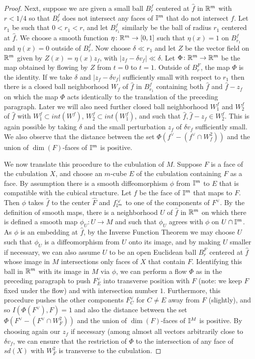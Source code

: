 \begin{proof}
	Next, suppose we are given a small ball $B^f_r$ centered at $\hat f$ in $\mathbb{R}^m$ with $r<1/4$ so that $B^f_r$ does not intersect any faces of $\mathbb{I}^m$ that do not intersect $f$.
	Let $r_1$ be such that $0<r_1<r$, and let $B^f_{r_1}$ similarly be the ball of radius $r_1$ centered at $\hat f$.
	We choose a smooth function $\eta \colon \mathbb{R}^m \to [0,1]$ such that $\eta(x) = 1$ on $B^f_{r_1}$ and $\eta(x) = 0$ outside of $B^f_r$.
	Now choose $\delta\ll r_1$ and let $Z$ be the vector field on $\mathbb{R}^m$ given by $Z(x) = \eta(x)z_f$, with $|z_f-\delta v_f|\ll \delta$.
	Let $\Phi \colon \mathbb{R}^m \to \mathbb{R}^m$ be the map obtained by flowing by $Z$ from $t = 0$ to $t = 1$.
	Outside of $B^F_{r}$, the map $\Phi$ is the identity.
	If we take $\delta$ and $|z_f-\delta v_f|$ sufficiently small with respect to $r_1$ then there is a closed ball neighborhood $W_f$ of $\hat f$ in $B^f_{r_1}$ containing both $\hat f$ and $\hat f-z_f$
	on which the map $\Phi$ acts identically to the translation of the preceding paragraph.
	Later we will also need further closed ball neighborhood $W^f_1$ and $W^f_2$ of $\hat f$ with $W^f_1 \subset int(W^f)$, $W^f_2 \subset int(W^f_1)$, and such that $\hat f, \hat f-z_f \in W^f_2$.
	This is again possible by taking $\delta$ and the small perturbation $z_f$ of $\delta v_f$ sufficiently small.
	We also observe that the distance between the set $\Phi(f^\vee-(f^\vee \cap W^2_f))$ and the union of $\dim(F)$-faces of $\mathbb{I}^m$ is positive.

	We now translate this procedure to the cubulation of $M$.
	Suppose $F$ is a face of the cubulation $X$, and choose an $m$-cube $E$ of the cubulation containing $F$ as a face.
	By assumption there is a smooth diffeomorphism $\phi$ from $\mathbb{I}^m$ to $E$ that is compatible with the cubical structure.
	Let $f$ be the face of $\mathbb{I}^m$ that maps to $F$.
	Then $\phi$ takes $\hat f$ to the center $\hat F$ and $f^\vee_{\mathbb{I}^m}$ to one of the components of $F^\vee$.
	By the definition of smooth maps, there is a neighborhood $U$ of $\hat f$ in $\mathbb{R}^m$ on which there is defined a smooth map $\phi_U:U \to M$ and such that $\phi_U$ agrees with $\phi$ on $U \cap \mathbb{I}^m$.
	As $\phi$ is an embedding at $\hat f$, by the Inverse Function Theorem we may choose $U$ such that $\phi_U$ is a diffeomorphism from $U$ onto its image, and by making $U$ smaller if necessary, we can also assume $U$ to be an open Euclidean ball $B^F_r$ centered at $\hat f$ whose image in $M$ intersections only faces of $X$ that contain $F$.
	Identifying this ball in $\mathbb{R}^m$ with its image in $M$ via $\phi$, we can perform a flow $\Phi$ as in the preceding paragraph to push $F^\vee_E$ into transverse position with $F$ (note: we keep $F$ fixed under the flow) and with intersection number $1$.
	Furthermore, this procedure pushes the other components $F^\vee_C$ for $C\neq E$ away from $F$ (slightly), and so $I(\Phi(F^\vee),F) = 1$ and also the distance between the set $\Phi(F^\vee-(F^\vee \cap W^2_F))$ and the union of $\dim(F)$-faces of $\mathbb{I}^M$ is positive.
	By choosing again our $z_f$ if necessary (among almost all vectors arbitrarily close to $\delta v_f$, we can ensure that the restriction of $\Phi$ to the intersection of any face of $sd(X)$ with $W^2_F$ is transverse to the cubulation.


\end{proof}
